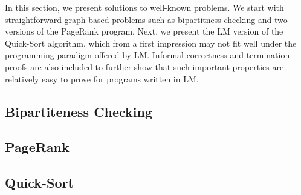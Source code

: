 In this section, we present solutions to well-known problems. We start with
straightforward graph-based problems such as bipartitness checking and two
versions of the PageRank program. Next, we present the LM version of the
Quick-Sort algorithm, which from a first impression may not fit well under the
programming paradigm offered by LM. Informal correctness and termination proofs
are also included to further show that such important properties are relatively
easy to prove for programs written in LM.

\subsection{Bipartiteness Checking}

\subsection{PageRank}\label{section:language:pagerank}

\subsection{Quick-Sort}

